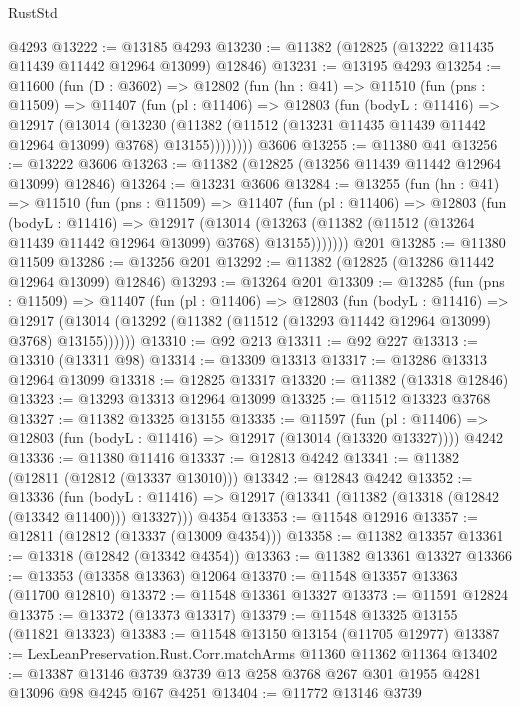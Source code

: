 \begin{lexlean}{RustStd}
\begin{coremodule}
    @4293
@13222 := @13185 @4293
@13230 := @11382 (@12825 (@13222 @11435 @11439 @11442 @12964 @13099) @12846)
@13231 := @13195 @4293
@13254 := @11600
    (fun (D : @3602) =>
    @12802
      (fun (hn : @41) =>
      @11510
        (fun (pns : @11509) =>
        @11407
          (fun (pl : @11406) =>
          @12803
            (fun (bodyL : @11416) =>
            @12917
              (@13014
                (@13230
                  (@11382 (@11512 (@13231 @11435 @11439 @11442 @12964 @13099) @3768) @13155))))))))
    @3606
@13255 := @11380 @41
@13256 := @13222 @3606
@13263 := @11382 (@12825 (@13256 @11439 @11442 @12964 @13099) @12846)
@13264 := @13231 @3606
@13284 := @13255
    (fun (hn : @41) =>
    @11510
      (fun (pns : @11509) =>
      @11407
        (fun (pl : @11406) =>
        @12803
          (fun (bodyL : @11416) =>
          @12917
            (@13014
              (@13263 (@11382 (@11512 (@13264 @11439 @11442 @12964 @13099) @3768) @13155)))))))
    @201
@13285 := @11380 @11509
@13286 := @13256 @201
@13292 := @11382 (@12825 (@13286 @11442 @12964 @13099) @12846)
@13293 := @13264 @201
@13309 := @13285
    (fun (pns : @11509) =>
    @11407
      (fun (pl : @11406) =>
      @12803
        (fun (bodyL : @11416) =>
        @12917 (@13014 (@13292 (@11382 (@11512 (@13293 @11442 @12964 @13099) @3768) @13155))))))
@13310 := @92 @213
@13311 := @92 @227
@13313 := @13310 (@13311 @98)
@13314 := @13309 @13313
@13317 := @13286 @13313 @12964 @13099
@13318 := @12825 @13317
@13320 := @11382 (@13318 @12846)
@13323 := @13293 @13313 @12964 @13099
@13325 := @11512 @13323 @3768
@13327 := @11382 @13325 @13155
@13335 := @11597
    (fun (pl : @11406) => @12803 (fun (bodyL : @11416) => @12917 (@13014 (@13320 @13327))))
    @4242
@13336 := @11380 @11416
@13337 := @12813 @4242
@13341 := @11382 (@12811 (@12812 (@13337 @13010)))
@13342 := @12843 @4242
@13352 := @13336
    (fun (bodyL : @11416) => @12917 (@13341 (@11382 (@13318 (@12842 (@13342 @11400))) @13327)))
    @4354
@13353 := @11548 @12916
@13357 := @12811 (@12812 (@13337 (@13009 @4354)))
@13358 := @11382 @13357
@13361 := @13318 (@12842 (@13342 @4354))
@13363 := @11382 @13361 @13327
@13366 := @13353 (@13358 @13363) @12064
@13370 := @11548 @13357 @13363 (@11700 @12810)
@13372 := @11548 @13361 @13327
@13373 := @11591 @12824
@13375 := @13372 (@13373 @13317)
@13379 := @11548 @13325 @13155 (@11821 @13323)
@13383 := @11548 @13150 @13154 (@11705 @12977)
@13387 := LexLeanPreservation.Rust.Corr.matchArms @11360 @11362 @11364
@13402 := @13387 @13146 @3739 @3739 @13 @258 @3768 @267 @301 @1955 @4281 @13096 @98 @4245 @167 @4251
@13404 := @11772 @13146 @3739

\end{coremodule}
\end{lexlean}
